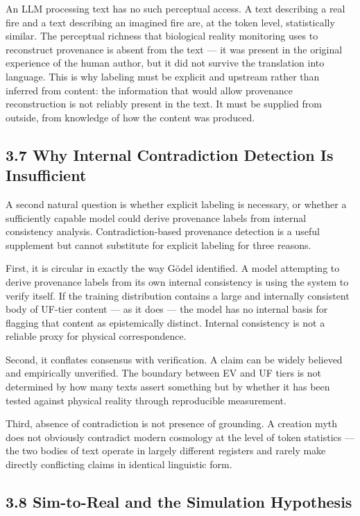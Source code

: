 \documentclass[
]{article}
\begin{document}
An LLM processing text has no such perceptual access. A text describing
a real fire and a text describing an imagined fire are, at the token
level, statistically similar. The perceptual richness that biological
reality monitoring uses to reconstruct provenance is absent from the
text --- it was present in the original experience of the human author,
but it did not survive the translation into language. This is why
labeling must be explicit and upstream rather than inferred from
content: the information that would allow provenance reconstruction is
not reliably present in the text. It must be supplied from outside, from
knowledge of how the content was produced.

\subsection{3.7 Why Internal Contradiction Detection Is
Insufficient}\label{why-internal-contradiction-detection-is-insufficient}

A second natural question is whether explicit labeling is necessary, or
whether a sufficiently capable model could derive provenance labels from
internal consistency analysis. Contradiction-based provenance detection
is a useful supplement but cannot substitute for explicit labeling for
three reasons.

First, it is circular in exactly the way Gödel identified. A model
attempting to derive provenance labels from its own internal consistency
is using the system to verify itself. If the training distribution
contains a large and internally consistent body of UF-tier content ---
as it does --- the model has no internal basis for flagging that content
as epistemically distinct. Internal consistency is not a reliable proxy
for physical correspondence.

Second, it conflates consensus with verification. A claim can be widely
believed and empirically unverified. The boundary between EV and UF
tiers is not determined by how many texts assert something but by
whether it has been tested against physical reality through reproducible
measurement.

Third, absence of contradiction is not presence of grounding. A creation
myth does not obviously contradict modern cosmology at the level of
token statistics --- the two bodies of text operate in largely different
registers and rarely make directly conflicting claims in identical
linguistic form.

\subsection{3.8 Sim-to-Real and the Simulation
Hypothesis}\label{sim-to-real-and-the-simulation-hypothesis}
\end{document}
